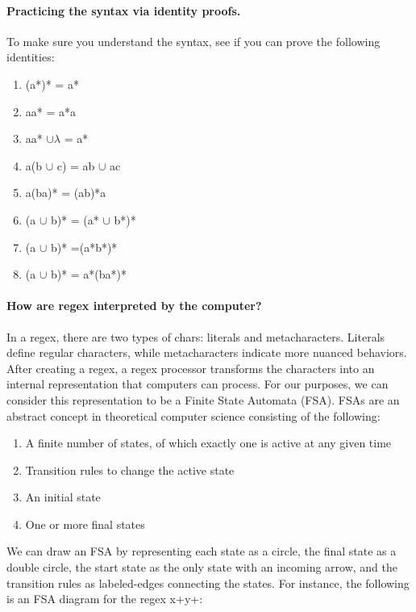 \documentclass[10pt]{article}
\begin{document}
\paragraph{Practicing the syntax via identity proofs.}
To make sure you understand the syntax, see if you can prove the following identities:
\begin{enumerate}
\item (a*)* = a*
\item aa* = a*a
\item aa* $\cup \lambda$ = a*
\item a(b $\cup$ c) = ab $\cup$ ac
\item a(ba)* = (ab)*a
\item (a $\cup$ b)* = (a* $\cup$ b*)*
\item (a $\cup$ b)* =(a*b*)*
\item (a $\cup$ b)* = a*(ba*)*
\end{enumerate}

\paragraph{How are regex interpreted by the computer?}
In a regex, there are two types of chars: literals and metacharacters.
Literals define regular characters, while metacharacters indicate
more nuanced behaviors.
After creating a regex, a regex processor transforms the characters into an internal
representation that computers can process.
For our purposes, we can consider this representation to be a Finite State Automata (FSA).
FSAs are an abstract concept in theoretical computer science consisting of the following:
\begin{enumerate}
\item A finite number of states, of which exactly one is active at any given time
\item Transition rules to change the active state
\item An initial state
\item One or more final states
\end{enumerate}
We can draw an FSA by representing each state as a circle, the final state
as a double circle, the start state as the only state with an incoming arrow,
and the transition rules as labeled-edges connecting the states.
For instance, the following is an FSA diagram for the regex x+y+:

{\centering
{}

}
\end{document}
